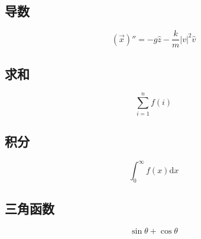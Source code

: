 \subsection{导数}
\begin{equation}
	(\vec{x})'' = -g \hat{z} - \frac{k}{m}|v|^2\hat{v}
\end{equation}

\subsection{求和}
\begin{equation}
	\sum_{i=1}^n f(i)
\end{equation}

\subsection{积分}
\begin{equation}
	\int_0^\infty f(x)\mathrm{d}x
\end{equation}

\subsection{三角函数}
\begin{equation}
	\sin\theta + \cos\theta
\end{equation}

\newpage
